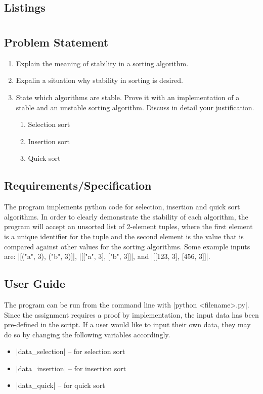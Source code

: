 \documentclass{report}
\begin{document}
\section{Listings}
\chapter{}
\section{Problem Statement}
\begin{enumerate}[label=(\alph*)]
	\item Explain the meaning of stability in a sorting algorithm.
	\item Expalin a situation why stability in sorting is desired.
	\item State which algorithms are stable. Prove it with an implementation of a stable and an unstable sorting algorithm. Discuss in detail your justification.
	\begin{enumerate}[label=\roman*.]
		\item Selection sort
		\item Insertion sort
		\item Quick sort
	\end{enumerate}
\end{enumerate}
\section{Requirements/Specification}
The program implements python code for selection, insertion and quick sort algorithms. In order to clearly demonstrate the stability of each algorithm, the program will accept an unsorted list of 2-element tuples, where the first element is a unique identifier for the tuple and the second element is the value that is compared against other values for the sorting algorithms. Some example inputs are: |[("a", 3), ("b", 3)]|, |[["a", 3], ["b", 3]]|, and |[[123, 3], [456, 3]]|.
\section{User Guide}
The program can be run from the command line with |python <filename>.py|. Since the assignment requires a proof by implementation, the input data has been pre-defined in the script. If a user would like to input their own data, they may do so by changing the following variables accordingly.
\begin{itemize}
	\item |data_selection| -- for selection sort
	\item |data_insertion| -- for insertion sort
	\item |data_quick| -- for quick sort
\end{itemize}
\end{document}

